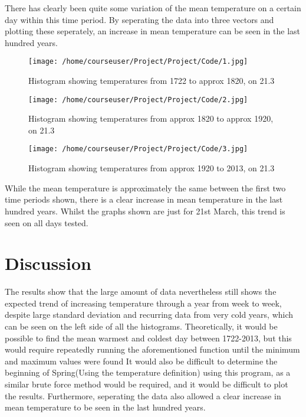 \documentclass[a4paper,10pt,oneside]{article}
\begin{document}
There has clearly been quite some variation of the mean temperature on a certain day within
this time period. By seperating the data into three vectors and plotting these seperately, an increase
in mean temperature can be seen in the last hundred years.
\begin{figure}[!ht]
 \texttt{[image: /home/courseuser/Project/Project/Code/1.jpg]}
 \caption{Histogram showing temperatures from 1722 to approx 1820, on 21.3}
 \label{fig:one}
\end{figure}

\begin{figure}[!ht]
 \texttt{[image: /home/courseuser/Project/Project/Code/2.jpg]}
 \caption{Histogram showing temperatures from approx 1820 to approx 1920, on 21.3}
 \label{fig:two}
\end{figure}

\begin{figure}[!ht]
 \texttt{[image: /home/courseuser/Project/Project/Code/3.jpg]}
 \caption{Histogram showing temperatures from approx 1920 to 2013, on 21.3}
 \label{fig:three}
\end{figure}

While the mean temperature is approximately the same between the first two time periods
shown, there is a clear increase in mean temperature in the last hundred years. Whilst the graphs
shown are just for 21st March, this trend is seen on all days tested.


\section{Discussion}
\label{sec:conc}

The results show that the large amount of data nevertheless still shows the expected trend of increasing temperature through a year from week
to week, despite large standard deviation and recurring data from very cold years, which can be seen on
the left side of all the histograms. Theoretically, it would be possible to find the mean warmest and coldest day between 1722-2013,
but this would require repeatedly running the aforementioned function until the minimum and maximum values were found
It would also be difficult to determine the beginning of Spring(Using the temperature definition) using this program,
as a similar brute force method would be required, and it would be difficult to plot the results. Furthermore, seperating
the data also allowed a clear increase in mean temperature to be seen in the last hundred years.






 
\end{document}
